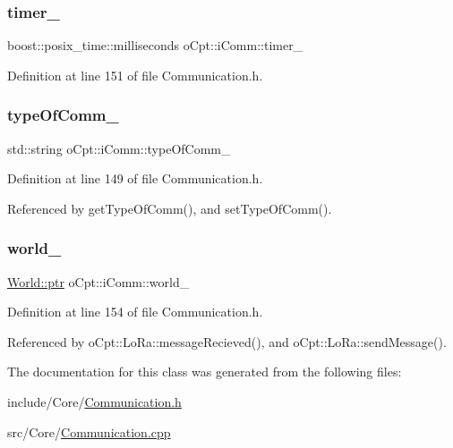 \subsubsection{\texorpdfstring{timer\+\_\+}{timer\_}}
{\footnotesize\ttfamily boost\+::posix\+\_\+time\+::milliseconds o\+Cpt\+::i\+Comm\+::timer\+\_\+\hspace{0.3cm}{\ttfamily [protected]}}



Definition at line 151 of file Communication.\+h.

\hypertarget{classo_cpt_1_1i_comm_a4805d3c40171aa763f029ebe1886e24f}{}\label{classo_cpt_1_1i_comm_a4805d3c40171aa763f029ebe1886e24f} 
\subsubsection{\texorpdfstring{type\+Of\+Comm\+\_\+}{typeOfComm\_}}
{\footnotesize\ttfamily std\+::string o\+Cpt\+::i\+Comm\+::type\+Of\+Comm\+\_\+\hspace{0.3cm}{\ttfamily [protected]}}



Definition at line 149 of file Communication.\+h.



Referenced by get\+Type\+Of\+Comm(), and set\+Type\+Of\+Comm().

\hypertarget{classo_cpt_1_1i_comm_a982de4fc52aa87006fc29a0b4667b231}{}\label{classo_cpt_1_1i_comm_a982de4fc52aa87006fc29a0b4667b231} 
\subsubsection{\texorpdfstring{world\+\_\+}{world\_}}
{\footnotesize\ttfamily \hyperlink{classo_cpt_1_1_world_aa6e591e3096d5de71e0cec9039663d67}{World\+::ptr} o\+Cpt\+::i\+Comm\+::world\+\_\+\hspace{0.3cm}{\ttfamily [protected]}}



Definition at line 154 of file Communication.\+h.



Referenced by o\+Cpt\+::\+Lo\+Ra\+::message\+Recieved(), and o\+Cpt\+::\+Lo\+Ra\+::send\+Message().



The documentation for this class was generated from the following files\+:\begin{DoxyCompactItemize}
\item 
include/\+Core/\hyperlink{_communication_8h}{Communication.\+h}\item 
src/\+Core/\hyperlink{_communication_8cpp}{Communication.\+cpp}\end{DoxyCompactItemize}
